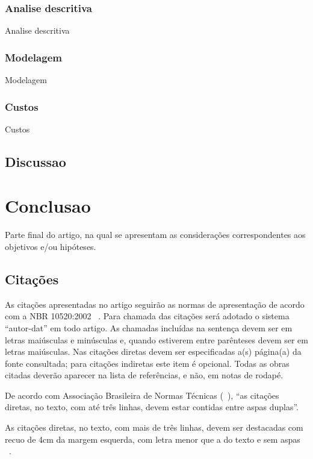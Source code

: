 \documentclass[article,a4paper,12pt,brazil,sumario=tradicional]{abntex2}
\renewenvironment{quotation}
  {\small\list{}{\rightmargin=0cm \leftmargin=2cm}%
   \item\relax}
  {\endlist}
\begin{document}
\subsubsection{Analise descritiva}

Analise descritiva

\subsubsection{Modelagem}

Modelagem

\subsubsection{Custos}

Custos

\subsection{Discussao}

\section{Conclusao}

Parte final do artigo, na qual se apresentam as considerações correspondentes aos objetivos e/ou hipóteses.

\subsection{Citações}

As citações apresentadas no artigo seguirão as normas de apresentação de acordo com a NBR 10520:2002 ~\cite{bibliografica6023}. Para chamada das citações será adotado o sistema ``autor-dat'' em todo artigo. As chamadas incluídas na sentença devem ser em letras maiúsculas e minúsculas e, quando estiverem entre parênteses devem ser em letras maiúsculas. Nas citações diretas devem ser especificadas a(s) página(a) da fonte consultada; para citações indiretas este item é opcional. Todas as obras citadas deverão aparecer na lista de referências, e não, em notas de rodapé.

De acordo com Associação Brasileira de Normas Técnicas (~\citeyear{bibliografica6023}), ``as citações diretas, no texto, com até três linhas, devem estar contidas entre aspas duplas''.

\begin{quotation}
\noindent
As citações diretas, no texto, com mais de três linhas, devem ser destacadas com recuo de 4cm da margem esquerda, com letra menor que a do texto e sem aspas ~\cite{bibliografica6023}.
\end{quotation}
\end{document}
